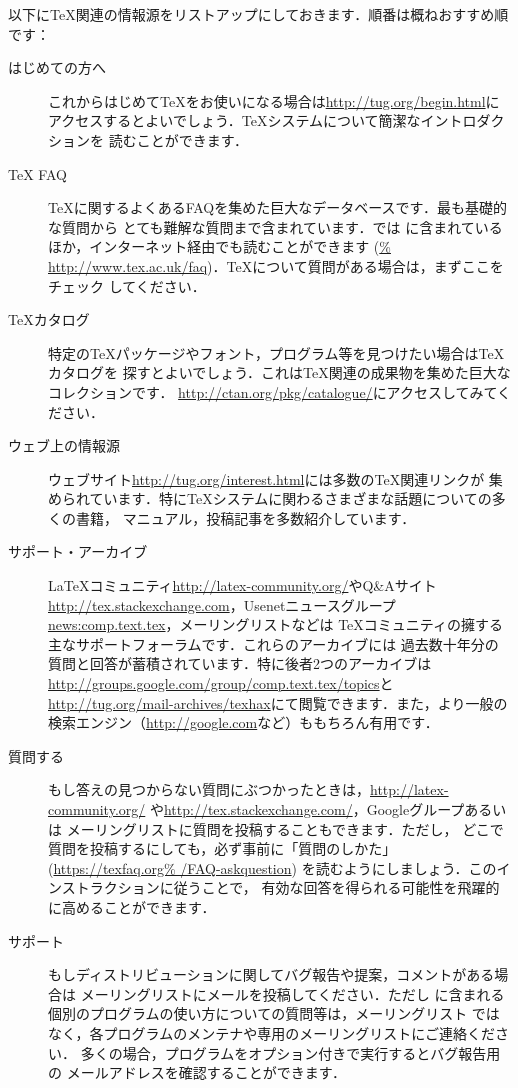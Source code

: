 \documentclass[uplatex,dvipdfmx]{jsarticle}
\begin{document}
以下に\TeX 関連の情報源をリストアップにしておきます．順番は概ねおすすめ順です：
%
\begin{description}
\item[はじめての方へ]
これからはじめて\TeX をお使いになる場合は\url{http://tug.org/begin.html}に
アクセスするとよいでしょう．\TeX システムについて簡潔なイントロダクションを
読むことができます．

\item[{\TeX} FAQ]
\TeX に関するよくあるFAQを集めた巨大なデータベースです．最も基礎的な質問から
とても難解な質問まで含まれています．\TL では
に含まれているほか，インターネット経由でも読むことができます (\url{%
http://www.tex.ac.uk/faq})．\TeX について質問がある場合は，まずここをチェック
してください．

\item[\TeX カタログ]
特定の\TeX パッケージやフォント，プログラム等を見つけたい場合は\TeX カタログを
探すとよいでしょう．これは\TeX 関連の成果物を集めた巨大なコレクションです．
\url{http://ctan.org/pkg/catalogue/}にアクセスしてみてください．

\item[ウェブ上の情報源]
ウェブサイト\url{http://tug.org/interest.html}には多数の\TeX 関連リンクが
集められています．特に\TeX システムに関わるさまざまな話題についての多くの書籍，
マニュアル，投稿記事を多数紹介しています．

\item[サポート・アーカイブ]
\LaTeX コミュニティ\url{http://latex-community.org/}やQ\&Aサイト
\url{http://tex.stackexchange.com}，Usenetニュースグループ
\url{news:comp.text.tex}，メーリングリストなどは
\TeX コミュニティの擁する主なサポートフォーラムです．これらのアーカイブには
過去数十年分の質問と回答が蓄積されています．特に後者2つのアーカイブは
\url{http://groups.google.com/group/comp.text.tex/topics}と
\url{http://tug.org/mail-archives/texhax}にて閲覧できます．また，より一般の
検索エンジン（\url{http://google.com}など）ももちろん有用です．

\item[質問する]
もし答えの見つからない質問にぶつかったときは，\url{http://latex-community.org/}%
や\url{http://tex.stackexchange.com/}，Googleグループあるいは
メーリングリストに質問を投稿することもできます．ただし，
どこで質問を投稿するにしても，必ず事前に「質問のしかた」(\url{https://texfaq.org%
/FAQ-askquestion}) を読むようにしましょう．このインストラクションに従うことで，
有効な回答を得られる可能性を飛躍的に高めることができます．

\item[\TL サポート]
もし\TL ディストリビューションに関してバグ報告や提案，コメントがある場合は
\TL メーリングリストにメールを投稿してください．ただし
\TL に含まれる個別のプログラムの使い方についての質問等は，\TL メーリングリスト
ではなく，各プログラムのメンテナや専用のメーリングリストにご連絡ください．
多くの場合，プログラムをオプション付きで実行するとバグ報告用の
メールアドレスを確認することができます．
\end{description}
\end{document}
